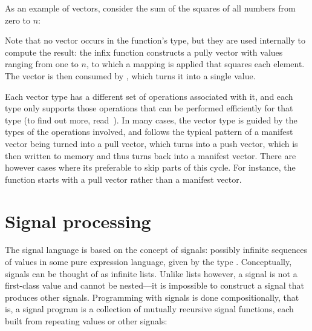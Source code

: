 \documentclass[../paper.tex]{subfiles}
\begin{document}
As an example of vectors, consider the sum of the squares of all numbers from zero to $n$:


\noindent Note that no vector occurs in the function's type, but they are used internally to compute the result: the infix function  constructs a pully vector with values ranging from one to $n$, to which a mapping is applied that squares each element. The vector is then consumed by , which turns it into a single value.

Each vector type has a different set of operations associated with it, and each type only supports those operations that can be performed efficiently for that type (to find out more, read~\cite{claessen2012}). In many cases, the vector type is guided by the types of the operations involved, and follows the typical pattern of a manifest vector being turned into a pull vector, which turns into a push vector, which is then written to memory and thus turns back into a manifest vector. There are however cases where its preferable to skip parts of this cycle. For instance, the  function starts with a pull vector rather than a manifest vector.



\section{Signal processing}
\label{signals}

The signal language is based on the concept of signals: possibly infinite sequences of values in some pure expression language, given by the type . Conceptually, signals can be thought of as infinite lists. Unlike lists however, a signal is not a first-class value and cannot be nested---it is impossible to construct a signal that produces other signals. Programming with signals is done compositionally, that is, a signal program is a collection of mutually recursive signal functions, each built from repeating values or other signals:
\end{document}
